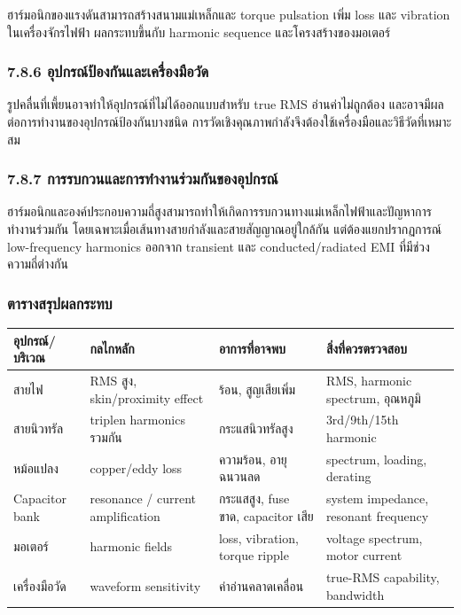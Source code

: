 ฮาร์มอนิกของแรงดันสามารถสร้างสนามแม่เหล็กและ torque pulsation เพิ่ม loss และ vibration ในเครื่องจักรไฟฟ้า ผลกระทบขึ้นกับ harmonic sequence และโครงสร้างของมอเตอร์

\subsubsection{7.8.6 อุปกรณ์ป้องกันและเครื่องมือวัด}

รูปคลื่นที่เพี้ยนอาจทำให้อุปกรณ์ที่ไม่ได้ออกแบบสำหรับ true RMS อ่านค่าไม่ถูกต้อง และอาจมีผลต่อการทำงานของอุปกรณ์ป้องกันบางชนิด การวัดเชิงคุณภาพกำลังจึงต้องใช้เครื่องมือและวิธีวัดที่เหมาะสม

\subsubsection{7.8.7 การรบกวนและการทำงานร่วมกันของอุปกรณ์}

ฮาร์มอนิกและองค์ประกอบความถี่สูงสามารถทำให้เกิดการรบกวนทางแม่เหล็กไฟฟ้าและปัญหาการทำงานร่วมกัน โดยเฉพาะเมื่อเส้นทางสายกำลังและสายสัญญาณอยู่ใกล้กัน แต่ต้องแยกปรากฏการณ์ low-frequency harmonics ออกจาก transient และ conducted/radiated EMI ที่มีช่วงความถี่ต่างกัน

\subsubsection{ตารางสรุปผลกระทบ}

\begin{table}[htbp]
    \centering
    \small
    \begin{tabularx}{\textwidth}{>{\raggedright\arraybackslash}p{} >{\raggedright\arraybackslash}X >{\raggedright\arraybackslash}X >{\raggedright\arraybackslash}X}
        \hline
        \textbf{อุปกรณ์/บริเวณ} & \textbf{กลไกหลัก} & \textbf{อาการที่อาจพบ} & \textbf{สิ่งที่ควรตรวจสอบ} \\
        \hline
        สายไฟ & RMS สูง, skin/proximity effect & ร้อน, สูญเสียเพิ่ม & RMS, harmonic spectrum, อุณหภูมิ \\
        สายนิวทรัล & triplen harmonics รวมกัน & กระแสนิวทรัลสูง & 3rd/9th/15th harmonic \\
        หม้อแปลง & copper/eddy loss & ความร้อน, อายุฉนวนลด & spectrum, loading, derating \\
        Capacitor bank & resonance / current amplification & กระแสสูง, fuse ขาด, capacitor เสีย & system impedance, resonant frequency \\
        มอเตอร์ & harmonic fields & loss, vibration, torque ripple & voltage spectrum, motor current \\
        เครื่องมือวัด & waveform sensitivity & ค่าอ่านคลาดเคลื่อน & true-RMS capability, bandwidth \\
        \hline
    \end{tabularx}
\end{table}

